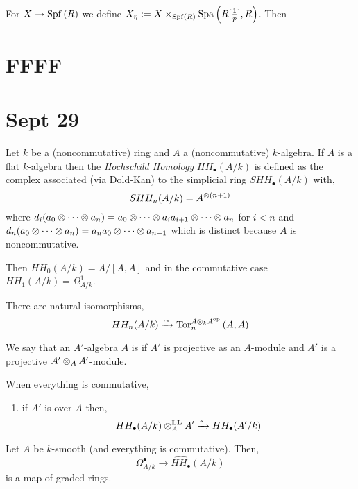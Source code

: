 \documentclass[12pt]{article}
\begin{document}
\newcommand{\Spa}[1]{\mathrm{Spa}\left( #1 \right)}

For $X \to \mathrm{Spf}\left( R \right)$ we define $X_\eta := X \times_{\Spf{R}} \Spa{R[\frac{1}{p}], R}$. Then 


\section{FFFF}

\section{Sept 29}

\newcommand{\LL}{\mathbf{LL}}

\begin{defn}
Let $k$ be a (noncommutative) ring and $A$ a (noncommutative) $k$-algebra. If $A$ is a flat $k$-algebra then the \textit{Hochschild Homology} $HH_\bullet(A/k)$ is defined as the complex associated (via Dold-Kan) to the simplicial ring $SHH_\bullet(A/k)$ with,
\[ SHH_n(A/k) = A^{\otimes (n+1)} \]
where $d_i(a_0 \otimes \cdots \otimes a_n) = a_0 \otimes \cdots \otimes a_i a_{i+1} \otimes \cdots \otimes a_n$ for $i < n$ and $d_n(a_0 \otimes \cdots \otimes a_n) = a_n a_0 \otimes \cdots \otimes a_{n-1}$ which is distinct because $A$ is noncommutative. 
\end{defn}

\begin{rmk}
Then $HH_0(A/k) = A / [A,A]$ and in the commutative case $HH_1(A/k) = \Omega^1_{A/k}$.
\end{rmk}

\begin{prop}
There are natural isomorphisms,
\[ HH_n(A/k) \xrightarrow{\sim} \mathrm{Tor}^{A \otimes_k A^{\mathrm{op}}}_{n} \left( A, A \right) \]
\end{prop}

\begin{defn}
We say that an $A'$-algebra $A$ is \etale if $A'$ is projective as an $A$-module and $A'$ is a projective $A' \otimes_A A'$-module.
\end{defn}

\begin{rmk}
When everything is commutative,
\begin{enumerate}
\item if $A'$ is \etale over $A$ then,
\[ HH_\bullet(A / k) \ot_A^{\LL} A' \iso HH_{\bullet}(A'/k) \]
\end{enumerate}
\end{rmk}

\begin{theorem}
Let $A$ be $k$-smooth (and everything is commutative). Then,
\[ \Omega^\bullet_{A/k} \to \widehat{HH_\bullet}(A/k) \]
is a map of graded rings. 
\end{theorem}
\end{document}

